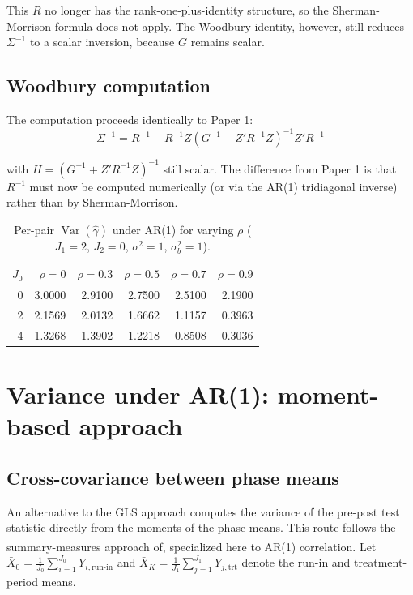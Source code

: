 \documentclass[
  11pt,
]{article}
\begin{document}
This \(R\) no longer has the rank-one-plus-identity
structure, so the Sherman-Morrison formula does not
apply. The Woodbury identity, however, still reduces
\(\Sigma^{-1}\) to a scalar inversion, because \(G\) remains
scalar.

\subsection{Woodbury computation}\label{woodbury-computation}

The computation proceeds identically to Paper 1:
\begin{equation}
  \Sigma^{-1} = R^{-1} - R^{-1}Z
    (G^{-1} + Z'R^{-1}Z)^{-1} Z'R^{-1}
\end{equation}

with \(H = (G^{-1} + Z'R^{-1}Z)^{-1}\) still scalar. The
difference from Paper 1 is that \(R^{-1}\) must now be
computed numerically (or via the AR(1) tridiagonal
inverse) rather than by Sherman-Morrison.

\begin{table}

\caption{\label{tab:ar1-variance}Per-pair $\mathop{\mathrm{Var}}(\hat\gamma)$ under AR(1) for varying $\rho$ ($J_1=2$, $J_2=0$, $\sigma^2=1$, $\sigma_b^2=1$).}
\centering
\begin{tabular}[t]{rrrrrr}
\toprule
$J_0$ & $\rho=0$ & $\rho=0.3$ & $\rho=0.5$ & $\rho=0.7$ & $\rho=0.9$\\
\midrule
0 & 3.0000 & 2.9100 & 2.7500 & 2.5100 & 2.1900\\
2 & 2.1569 & 2.0132 & 1.6662 & 1.1157 & 0.3963\\
4 & 1.3268 & 1.3902 & 1.2218 & 0.8508 & 0.3036\\
\bottomrule
\end{tabular}
\end{table}

\section{Variance under AR(1): moment-based approach}\label{variance-under-ar1-moment-based-approach}

\subsection{Cross-covariance between phase means}\label{cross-covariance-between-phase-means}

An alternative to the GLS approach computes the
variance of the pre-post test statistic directly from
the moments of the phase means. This route follows the
summary-measures approach of\textsuperscript{}, specialized
here to AR(1) correlation. Let
\(\bar{X}_0 = \frac{1}{J_0}\sum_{i=1}^{J_0} Y_{i,\text{run-in}}\)
and
\(\bar{X}_K = \frac{1}{J_1}\sum_{j=1}^{J_1} Y_{j,\text{trt}}\)
denote the run-in and treatment-period means.
\end{document}
